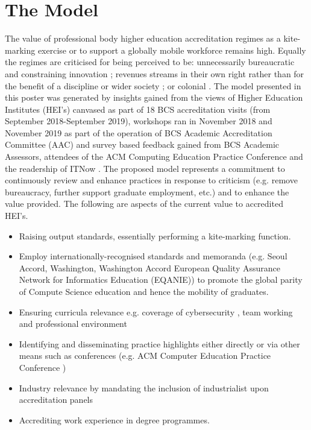 \documentclass[sigconf]{acmart}
\begin{document}
\section{The Model}
The value of professional body higher education accreditation regimes as a kite-marking exercise or to support a globally mobile workforce \cite{Knight_2015} remains high. Equally the regimes are criticised for being perceived to be: unnecessarily bureaucratic and constraining innovation \cite{Harvey2004}; revenues streams in their own right rather than for the benefit of a discipline or wider society \cite{Knight_2015}; or colonial \cite{Mutereko2017}.  
The model presented in this poster was generated by insights gained from the views of Higher Education Institutes (HEI's) canvased as part of 18 BCS  accreditation visits (from September 2018-September 2019), workshops ran in November 2018 and November 2019 as part of the operation of BCS Academic Accreditation Committee (AAC) and survey based feedback gained from BCS Academic Assessors,  attendees of the ACM Computing Education Practice Conference \cite{CrickEtAl2020Cep} and the readership of ITNow \cite{CrickEtAl2020ITNow}.
The proposed model represents a commitment to continuously review and enhance practices in response to criticism (e.g. remove bureaucracy, further support graduate employment, etc.) and to enhance the value provided. The following are aspects of the current value to accredited HEI's.
\begin{itemize}
	\item {Raising output standards, essentially performing a kite-marking function.}
	\item {Employ internationally-recognised standards and memoranda (e.g. Seoul Accord, Washington, Washington Accord European Quality Assurance Network for Informatics Education (EQANIE)) to promote the global parity of Compute Science education and hence the mobility of graduates.} 
	\item {Ensuring curricula relevance e.g. coverage of cybersecurity \cite{Cricketal2019}, team working and professional environment}
	\item {Identifying and disseminating practice highlights either directly \cite{practice_highlights_2020} or via other means such as conferences (e.g. ACM Computer Education Practice Conference \cite{CrickEtAl2020Cep}} )
	\item {Industry relevance by mandating the inclusion of industrialist upon accreditation panels} 
	\item {Accrediting work experience in degree programmes.}
\end{itemize}
\end{document}
